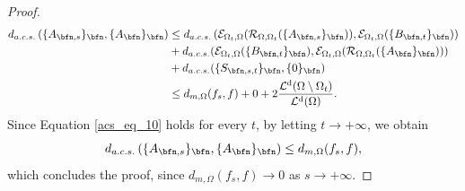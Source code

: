 \documentclass{amsart}
\DeclareMathOperator{\Ld}{\mathcal{L}^d}
\begin{document}
\begin{proof}
\begin{align}
       d_{a.c.s.}\left(\{A_{\bfn,s}\}_\bfn, \{A_\bfn\}_\bfn\right)&\leq d_{a.c.s.}\left(\mathcal{E}_{\Omega_t,\Omega}(\mathcal{R}_{\Omega,\Omega_t}(\{A_{\bfn,s}\}_\bfn)),\mathcal{E}_{\Omega_t,\Omega}(\{B_{\bfn,t}\}_\bfn)\right)\\
       \nonumber&+d_{a.c.s.}(\mathcal{E}_{\Omega_t,\Omega}(\{B_{\bfn,t}\}_\bfn),\mathcal{E}_{\Omega_t,\Omega}(\mathcal{R}_{\Omega,\Omega_t}(\{A_\bfn\}_\bfn)))\\
       \nonumber&+d_{a.c.s.}(\{S_{\bfn,s,t}\}_\bfn,\{0\}_\bfn)\\
       \nonumber&\leq d_{m,\Omega}(f_s,f)+ 0 + 2\frac{\Ld(\Omega\setminus\Omega_t)}{\Ld(\Omega)}.
   \end{align}
   Since Equation \eqref{acs_eq_10} holds for every $t$, by letting $t\to+\infty$, we obtain
   \begin{equation*}
       d_{a.c.s.}\left(\{A_{\bfn,s}\}_\bfn, \{A_\bfn\}_\bfn\right)\leq d_{m,\Omega}(f_s,f),
   \end{equation*}
   which concludes the proof, since $d_{m,\Omega}(f_s,f)\to 0$ as $s\to+\infty$.
   \end{proof}
\end{document}
